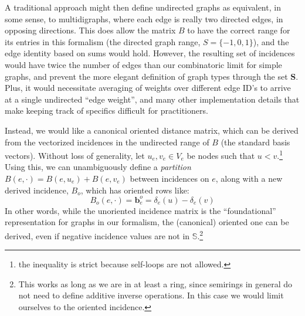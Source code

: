 \documentclass[%
	12pt,
		oneside,
		letterpaper
]{book}
\begin{document}
A traditional approach might then define undirected graphs as
equivalent, in some sense, to multidigraphs, where each edge is really
two directed edges, in opposing directions. This does allow the matrix
\(B\) to have the correct range for its entries in this formalism (the
directed graph range, \(S=\{-1,0,1\}\)), and the edge identity based on
sums would hold. However, the resulting set of incidences would have
twice the number of edges than our combinatoric limit for simple graphs,
and prevent the more elegant definition of graph types through the set
\(\mathbf{S}\). Plus, it would necessitate averaging of weights over
different edge ID's to arrive at a single undirected ``edge weight'',
and many other implementation details that make keeping track of
specifics difficult for practitioners.

Instead, we would like a canonical oriented distance matrix, which can
be derived from the vectorized incidences in the undirected range of
\(B\) (the standard basis vectors). Without loss of generality, let
\(u_e,v_e\in V_e\) be nodes such that \(u<v\).\footnote{the inequality
  is strict because self-loops are not allowed.} Using this, we can
unambiguously define a \emph{partition}
\(B(e,\cdot)=B(e,u_e) + B(e,v_e)\) between incidences on \(e\), along
with a new derived incidence, \(B_o\), which has oriented rows like:
\[B_o(e,\cdot)=\mathbf{b}^o_e = \delta_e(u)-\delta_e(v)\] In other
words, while the unoriented incidence matrix is the ``foundational''
representation for graphs in our formalism, the (canonical) oriented one
can be derived, even if negative incidence values are not in
\(\mathbb{S}\).\footnote{ This works as long as we are in at least a
  ring, since semirings in general do not need to define additive
  inverse operations. In this case we would limit ourselves to the
  oriented incidence.}
\end{document}
